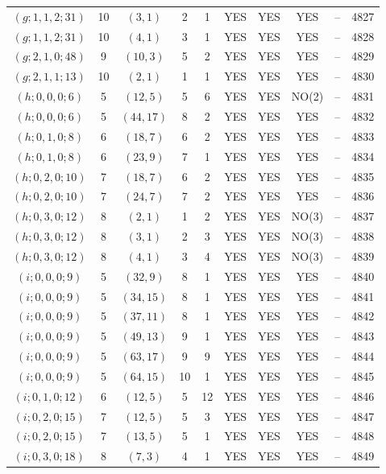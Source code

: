 \begin{longtable}{|c|c|c|c|c|c|c|c|c|c|}
$(g; 1, 1, 2; 31)$ & 10 & $(3, 1)$ & 2 & 1 & YES & YES & YES & -- & 4827\\
$(g; 1, 1, 2; 31)$ & 10 & $(4, 1)$ & 3 & 1 & YES & YES & YES & -- & 4828\\
$(g; 2, 1, 0; 48)$ & 9 & $(10, 3)$ & 5 & 2 & YES & YES & YES & -- & 4829\\
$(g; 2, 1, 1; 13)$ & 10 & $(2, 1)$ & 1 & 1 & YES & YES & YES & -- & 4830\\
$(h; 0, 0, 0; 6)$ & 5 & $(12, 5)$ & 5 & 6 & YES & YES & NO(2) & -- & 4831\\
$(h; 0, 0, 0; 6)$ & 5 & $(44, 17)$ & 8 & 2 & YES & YES & YES & -- & 4832\\
$(h; 0, 1, 0; 8)$ & 6 & $(18, 7)$ & 6 & 2 & YES & YES & YES & -- & 4833\\
$(h; 0, 1, 0; 8)$ & 6 & $(23, 9)$ & 7 & 1 & YES & YES & YES & -- & 4834\\
$(h; 0, 2, 0; 10)$ & 7 & $(18, 7)$ & 6 & 2 & YES & YES & YES & -- & 4835\\
$(h; 0, 2, 0; 10)$ & 7 & $(24, 7)$ & 7 & 2 & YES & YES & YES & -- & 4836\\
$(h; 0, 3, 0; 12)$ & 8 & $(2, 1)$ & 1 & 2 & YES & YES & NO(3) & -- & 4837\\
$(h; 0, 3, 0; 12)$ & 8 & $(3, 1)$ & 2 & 3 & YES & YES & NO(3) & -- & 4838\\
$(h; 0, 3, 0; 12)$ & 8 & $(4, 1)$ & 3 & 4 & YES & YES & NO(3) & -- & 4839\\
$(i; 0, 0, 0; 9)$ & 5 & $(32, 9)$ & 8 & 1 & YES & YES & YES & -- & 4840\\
$(i; 0, 0, 0; 9)$ & 5 & $(34, 15)$ & 8 & 1 & YES & YES & YES & -- & 4841\\
$(i; 0, 0, 0; 9)$ & 5 & $(37, 11)$ & 8 & 1 & YES & YES & YES & -- & 4842\\
$(i; 0, 0, 0; 9)$ & 5 & $(49, 13)$ & 9 & 1 & YES & YES & YES & -- & 4843\\
$(i; 0, 0, 0; 9)$ & 5 & $(63, 17)$ & 9 & 9 & YES & YES & YES & -- & 4844\\
$(i; 0, 0, 0; 9)$ & 5 & $(64, 15)$ & 10 & 1 & YES & YES & YES & -- & 4845\\
$(i; 0, 1, 0; 12)$ & 6 & $(12, 5)$ & 5 & 12 & YES & YES & YES & -- & 4846\\
$(i; 0, 2, 0; 15)$ & 7 & $(12, 5)$ & 5 & 3 & YES & YES & YES & -- & 4847\\
$(i; 0, 2, 0; 15)$ & 7 & $(13, 5)$ & 5 & 1 & YES & YES & YES & -- & 4848\\
$(i; 0, 3, 0; 18)$ & 8 & $(7, 3)$ & 4 & 1 & YES & YES & YES & -- & 4849\\

\end{longtable}
